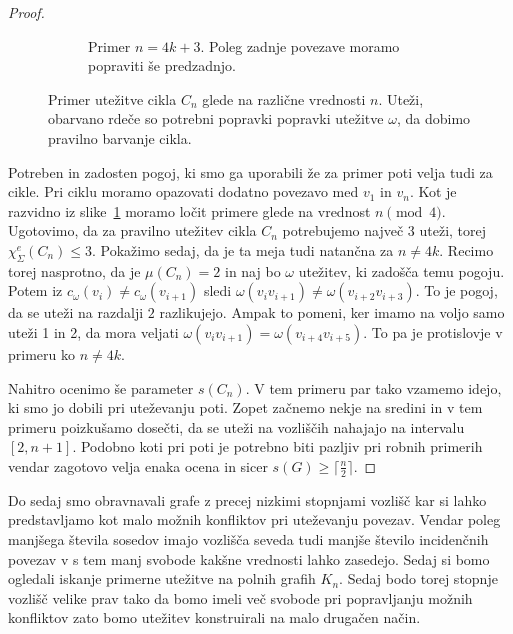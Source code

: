 \documentclass[12pt,a4paper,twoside]{article}
\theoremstyle{definition} %
\theoremstyle{plain} %
\newcommand{\ec}{\chi_{\Sigma}^e}
\numberwithin{equation}{section}  %
\begin{document}
\begin{proof}
\begin{figure}[]
\begin{subfigure}{0.475\textwidth}
		\caption{Primer $n = 4k + 3$. Poleg zadnje povezave moramo popraviti še predzadnjo.}
	\end{subfigure}
\caption{Primer utežitve cikla $C_n$ glede na različne vrednosti $n$. Uteži, obarvano rdeče so potrebni popravki popravki utežitve $\omega$, da dobimo pravilno barvanje cikla.}
\label{fig:cnall}
\end{figure}
Potreben in zadosten pogoj, ki smo ga uporabili že za primer poti velja tudi za cikle. Pri ciklu moramo opazovati dodatno povezavo med $v_1$ in $v_n$. Kot je razvidno iz slike~\ref{fig:cnall} moramo ločit primere glede na vrednost $n \pmod{4}$. Ugotovimo, da za pravilno utežitev cikla $C_n$ potrebujemo največ 3 uteži, torej $\ec(C_n) \le 3$. Pokažimo sedaj, da je ta meja tudi natančna za $n \neq 4k$. Recimo torej nasprotno, da je $\mu(C_n) = 2$ in naj bo $\omega$ utežitev, ki zadošča temu pogoju. Potem iz $c_{\omega}(v_i) \neq c_{\omega}(v_{i+1})$ sledi $\omega(v_i v_{i+1}) \neq \omega({v_{i+2} v_{i+3}})$. To je pogoj, da se uteži na razdalji $2$ razlikujejo. Ampak to pomeni, ker imamo na voljo samo uteži 1 in 2, da mora veljati $\omega(v_i v_{i+1}) = \omega({v_{i+4} v_{i+5}})$. To pa je protislovje v primeru ko $n \neq 4k$.

Nahitro ocenimo še parameter $s(C_n)$. V tem primeru par tako vzamemo idejo, ki smo jo dobili pri uteževanju poti. Zopet začnemo nekje na sredini in v tem primeru poizkušamo dosečti, da se uteži na vozliščih nahajajo na intervalu $[2, n+1]$. Podobno koti pri poti je potrebno biti pazljiv pri robnih primerih vendar zagotovo velja enaka ocena in sicer $s(G) \ge \lceil \frac{n}{2} \rceil$.
	
	
\end{proof}
Do sedaj smo obravnavali grafe z precej nizkimi stopnjami vozlišč kar si lahko predstavljamo kot malo možnih konfliktov pri uteževanju povezav. Vendar poleg manjšega števila sosedov imajo vozlišča seveda tudi manjše število incidenčnih povezav v s tem manj svobode kakšne vrednosti lahko zasedejo. Sedaj si bomo ogledali iskanje primerne utežitve na polnih grafih $K_n$. Sedaj bodo torej stopnje vozlišč velike prav tako da bomo imeli več svobode pri popravljanju možnih konfliktov zato bomo utežitev konstruirali na malo drugačen način.
\end{document}
